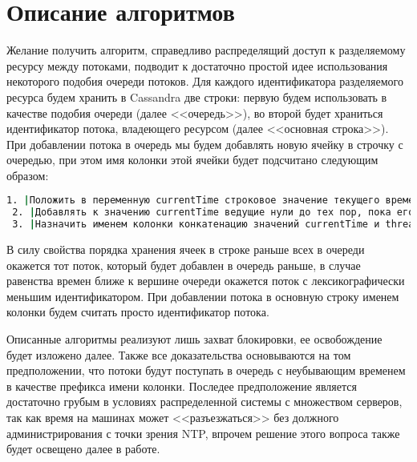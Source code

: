 \section{Описание алгоритмов}

Желание получить алгоритм, справедливо распределящий доступ к разделяемому ресурсу между потоками, подводит к достаточно простой идее использования некоторого подобия очереди потоков.
Для каждого идентификатора разделяемого ресурса будем хранить в Cassandra две строки: первую будем использовать в качестве подобия очереди (далее <<очередь>>), во второй будет храниться идентификатор потока, владеющего ресурсом (далее <<основная строка>>).
При добавлении потока в очередь мы будем добавлять новую ячейку в строчку с очередью, при этом имя колонки этой ячейки будет подсчитано следующим образом:

\begin{lstlisting}[language=csh,caption={Определение имени колонки для ячейки в очереди}]
 1. |Положить в переменную currentTime строковое значение текущего времени в микросекундах|
 2. |Добавлять к значению currentTime ведущие нули до тех пор, пока его длина не станет равной 20|
 3. |Назначить именем колонки конкатенацию значений currentTime и threadId|
\end{lstlisting}

В силу свойства порядка хранения ячеек в строке раньше всех в очереди окажется тот поток, который будет добавлен в очередь раньше, в случае равенства времен ближе к вершине очереди окажется поток с лексикографически меньшим идентификатором.
При добавлении потока в основную строку именем колонки будем считать просто идентификатор потока.

Описанные алгоритмы реализуют лишь захват блокировки, ее освобождение будет изложено далее.
Также все доказательства основываются на том предположении, что потоки будут поступать в очередь с неубывающим временем в качестве префикса имени колонки. Последее предположение является достаточно грубым в условиях распределенной системы с множеством серверов, так как время на машинах может <<разъезжаться>> без должного администрирования с точки зрения NTP, впрочем решение этого вопроса также будет освещено далее в работе.



